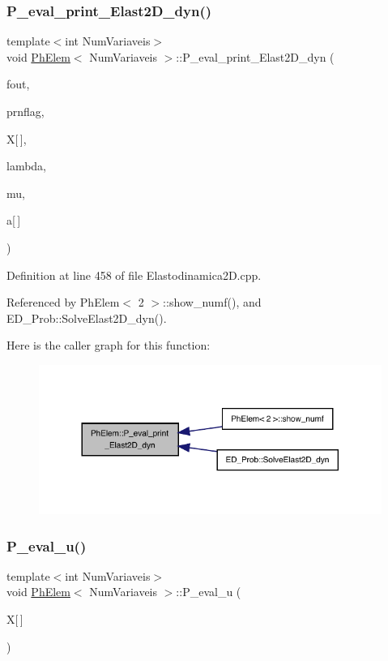 \subsubsection{\texorpdfstring{P\+\_\+eval\+\_\+print\+\_\+\+Elast2\+D\+\_\+dyn()}{P\_eval\_print\_Elast2D\_dyn()}}
{\footnotesize\ttfamily template$<$int Num\+Variaveis$>$ \\
void \hyperlink{classPhElem}{Ph\+Elem}$<$ Num\+Variaveis $>$\+::P\+\_\+eval\+\_\+print\+\_\+\+Elast2\+D\+\_\+dyn (\begin{DoxyParamCaption}\item[{F\+I\+LE $\ast$}]{fout,  }\item[{const int \&}]{prnflag,  }\item[{const double}]{X\mbox{[}$\,$\mbox{]},  }\item[{double}]{lambda,  }\item[{double}]{mu,  }\item[{const double}]{a\mbox{[}$\,$\mbox{]} }\end{DoxyParamCaption})}



Definition at line 458 of file Elastodinamica2\+D.\+cpp.



Referenced by Ph\+Elem$<$ 2 $>$\+::show\+\_\+numf(), and E\+D\+\_\+\+Prob\+::\+Solve\+Elast2\+D\+\_\+dyn().

Here is the caller graph for this function\+:
\nopagebreak
\begin{figure}[H]
\begin{center}
\leavevmode
\includegraphics[width=317pt]{classPhElem_a467c1ae6065913d0ec9828c9d055539a_icgraph}
\end{center}
\end{figure}
\mbox{\label{classPhElem_acd85a3728b9566c086c1450a35e6231f}} 
\subsubsection{\texorpdfstring{P\+\_\+eval\+\_\+u()}{P\_eval\_u()}\hspace{0.1cm}{\footnotesize\ttfamily [1/2]}}
{\footnotesize\ttfamily template$<$int Num\+Variaveis$>$ \\
void \hyperlink{classPhElem}{Ph\+Elem}$<$ Num\+Variaveis $>$\+::P\+\_\+eval\+\_\+u (\begin{DoxyParamCaption}\item[{const double}]{X\mbox{[}$\,$\mbox{]} }\end{DoxyParamCaption})}



